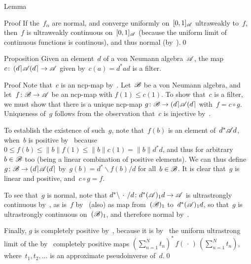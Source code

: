 \documentclass[a]{subfiles}
\begin{document}
\begin{parsec}
\begin{point}{Lemma}
\begin{point}{Proof}
If the~$f_\alpha$ 
are normal,
and converge uniformly on~$[0,1]_{\mathscr{A}}$ ultraweakly
to~$f$,
then~$f$ is ultraweakly continuous
on~$[0,1]_{\mathscr{A}}$
(because the uniform limit of continuous functions is continous),
and thus normal (by~).\qed
\end{point}
\end{point}
\begin{point}{Proposition}%
Given an element~$d$ of a von Neumann algebra~$\mathscr{A}$,
the map $c\colon \left(d\right\rceil\!\mathscr{A}\!\left(d\right\rceil\to\mathscr{A}$
given by~$c(a)=d^*ad$
is a filter.
\begin{point}{Proof}%
Note that~$c$ is an ncp-map by~.
Let~$\mathscr{B}$ be a von Neumann algebra,
and let~$f\colon \mathscr{B}\to\mathscr{A}$ be an ncp-map
with $f(1)\leq c(1)$.
To show that~$c$ is a filter,
we must show that there is a unique ncp-map
$g\colon \mathscr{B}\to
\left(d\right\rceil\!\mathscr{A}\!\left(d\right\rceil$
with~$f=c\circ g$.
Uniqueness of~$g$ follows from the observation
that~$c$ is injective by~.

To establish the existence of such~$g$,
note that~$f(b)$ is an element of~$d^*\mathscr{A} d$,
when~$b$ is positive
by~
because~$0\leq f(b)\leq \|b\|f(1)\leq \|b\| c(1)=\|b\|d^*d$,
and thus for arbitrary~$b\in\mathscr{B}$ too
(being a linear combination
of positive elements).
We can thus define $g\colon \mathscr{B}\to \left(d\right\rceil\!\mathscr{A}\!\left(d\right\rceil$
by~$g(b)=d^*\backslash f(b)/d$
for all~$b\in\mathscr{B}$.
It is clear that~$g$ is linear and positive,
and~$c\circ g=f$.

To see that~$g$ is normal,
note that
$d^*\backslash\,\cdot\,/d\colon
d^*(\mathscr{A})_1 d\to\mathscr{A}$
is ultrastrongly continuous by~,
as is~$f$ by~
(also) as map from~$(\mathscr{B})_1$ to~$d^*(\mathscr{A})_1 d$,
so that~$g$ is ultrastrongly continuous on~$(\mathscr{B})_1$,
and therefore normal by~.

Finally, $g$ is completely positive
by~,
because it is by~
the uniform ultrastrong limit
of the by~ completely positive maps
$(\sum_{n=1}^Nt_n)^* \,f(\,\cdot\,)\,(\sum_{n=1}^N t_n)$,
where~$t_1,t_2,\dotsc$
is an approximate pseudoinverse of~$d$.\qed
\end{point}
\end{point}
\end{parsec}
\end{document}

